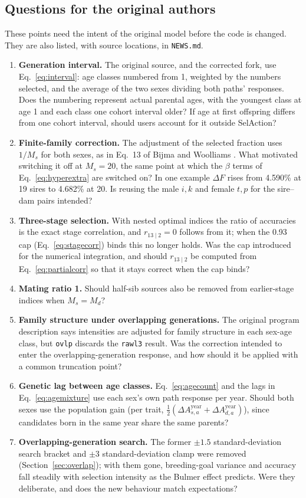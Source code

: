 \documentclass[11pt]{article}
\newcommand{\src}[1]{\texttt{#1}}
\begin{document}
\subsection{Questions for the original authors}\label{sec:questions}
These points need the intent of the original model before the code is changed. They are also listed, with source locations, in \src{NEWS.md}.
\begin{enumerate}
\item \textbf{Generation interval.} The original source, and the corrected fork, use Eq.~\eqref{eq:interval}: age classes numbered from 1, weighted by the numbers selected, and the average of the two sexes dividing both paths' responses. Does the numbering represent actual parental ages, with the youngest class at age 1 and each class one cohort interval older? If age at first offspring differs from one cohort interval, should users account for it outside SelAction?
\item \textbf{Finite-family correction.} The adjustment of the selected fraction uses $1/M_s$ for both sexes, as in Eq.~13 of Bijma and Woolliams \cite{bijmawoolliams2000}. What motivated switching it off at $M_s=20$, the same point at which the $\beta$ terms of Eq.~\eqref{eq:hyperextra} are switched on? In one example $\Delta F$ rises from 4.590\% at 19 sires to 4.682\% at 20. Is reusing the male $i,k$ and female $t,p$ for the sire--dam pairs intended?
\item \textbf{Three-stage selection.} With nested optimal indices the ratio of accuracies is the exact stage correlation, and $r_{13\mid2}=0$ follows from it; when the 0.93 cap (Eq.~\eqref{eq:stagecorr}) binds this no longer holds. Was the cap introduced for the numerical integration, and should $r_{13\mid2}$ be computed from Eq.~\eqref{eq:partialcorr} so that it stays correct when the cap binds?
\item \textbf{Mating ratio 1.} Should half-sib sources also be removed from earlier-stage indices when $M_s=M_d$?
\item \textbf{Family structure under overlapping generations.} The original program description says intensities are adjusted for family structure in each sex-age class, but \src{ovlp} discards the \src{rawl3} result. Was the correction intended to enter the overlapping-generation response, and how should it be applied with a common truncation point?
\item \textbf{Genetic lag between age classes.} Eq.~\eqref{eq:agecount} and the lags in Eq.~\eqref{eq:agemixture} use each sex's own path response per year. Should both sexes use the population gain (per trait, $\tfrac12(\Delta A_{s,a}^{\mathrm{year}}+\Delta A_{d,a}^{\mathrm{year}})$), since candidates born in the same year share the same parents?
\item \textbf{Overlapping-generation search.} The former $\pm1.5$ standard-deviation search bracket and $\pm3$ standard-deviation clamp were removed (Section~\ref{sec:overlap}); with them gone, breeding-goal variance and accuracy fall steadily with selection intensity as the Bulmer effect predicts. Were they deliberate, and does the new behaviour match expectations?
\end{enumerate}
\end{document}
